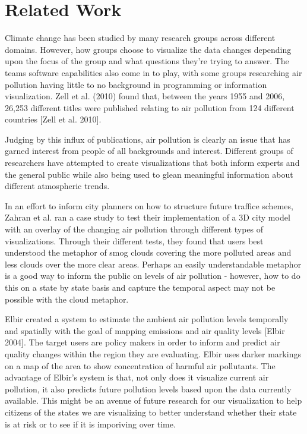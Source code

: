 \documentclass[journal]{vgtc}                %
\begin{document}
\section{Related Work}

Climate change has been studied by many research groups across different domains. However, how groups choose to visualize
the data changes depending upon the focus of the group and what questions they're trying to answer. The teams software
capabilities also come in to play, with some groups researching air pollution having little to no background in 
programming or information visualization. Zell et al. (2010) found that, between the years 1955 and 2006, 
26,253 different titles were published relating to air pollution from 124 different countries [Zell et al. 2010]. 


Judging by this influx of publications, air pollution is clearly an issue that has garned interest from people of all
backgrounds and interest. Different groups of researchers have attempted to create visualizations that both inform
experts and the general public while also being used to glean meaningful information about different atmospheric trends.

In an effort to inform city planners on how to structure future traffice schemes, Zahran et al. ran a case study
to test their implementation of a 3D city model with an overlay of the changing air pollution through different types of
visualizations. Through their different tests, they found that users best understood the metaphor of smog clouds 
covering the more polluted areas and less clouds over the more clear areas.
Perhaps an easily understandable metaphor is a good way to inform the public on levels of air pollution - however, how
to do this on a state by state basis and capture the temporal aspect may not be possible with the cloud metaphor. 

Elbir created a system to estimate the ambient air pollution levels temporally and spatially with the goal of mapping
emissions and air quality levels [Elbir 2004]. 
The target users are policy makers in order to inform and predict air quality changes within the region they are 
evaluating. Elbir uses darker markings on a map of the area to show concentration of harmful air pollutants.
The advantage of Elbir's system is that, not only does it visualize current air pollution, it also predicts future
pollution levels based upon the data currently available. This might be an avenue of future research for our
visualization to help citizens of the states we are visualizing to better understand whether their state is at risk or
to see if it is imporiving over time. 
\end{document}
